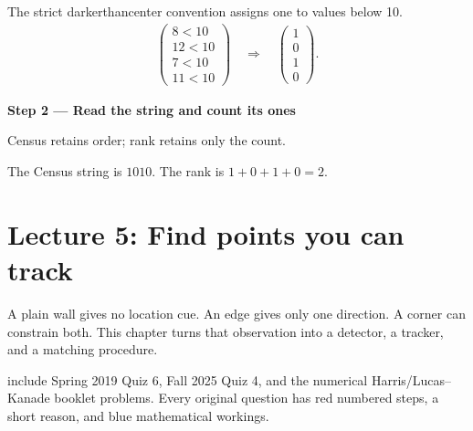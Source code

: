 \documentclass[letterpaper,11pt,english,openany,oneside]{jupyterBook}
\begin{document}
\sphinxAtStartPar
{} The strict darker\sphinxhyphen{}than\sphinxhyphen{}center convention assigns one to values below 10.
{\color{QuizMathBlue} \begin{equation*}
\begin{split}
\begin{pmatrix}8<10\\12<10\\7<10\\11<10\end{pmatrix}\quad\Rightarrow\quad\begin{pmatrix}1\\0\\1\\0\end{pmatrix}.
\end{split}
\end{equation*}}
\par

\par\medskip{}
{\color{QuizStepRed}\bfseries Step 2 — Read the string and count its ones}\par\smallskip

\sphinxAtStartPar
{} Census retains order; rank retains only the count.

\sphinxAtStartPar
The Census string is {\color{QuizMathBlue} \(1010\)}. The rank is {\color{QuizMathBlue} \(1+0+1+0=2\)}.

\par

\par\medskip

\sphinxstepscope


\chapter{Lecture 5: Find points you can track}
\label{\detokenize{lectures/lecture05/index:lecture-5-find-points-you-can-track}}\label{\detokenize{lectures/lecture05/index:lecture05}}\label{\detokenize{lectures/lecture05/index::doc}}
\sphinxAtStartPar
{} A plain wall gives no location cue. An edge gives only one direction. A corner can constrain both. This chapter turns that observation into a detector, a tracker, and a matching procedure.

\sphinxAtStartPar
{} include Spring 2019 Quiz 6, Fall 2025 Quiz 4, and the numerical Harris/Lucas–Kanade booklet problems. Every original question has red numbered steps, a short reason, and blue mathematical workings.
\end{document}
